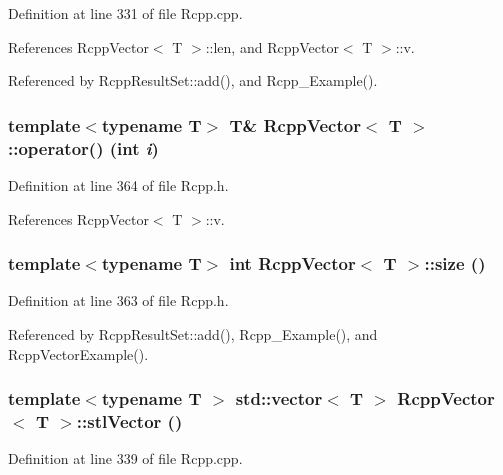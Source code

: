 Definition at line 331 of file Rcpp.cpp.

References RcppVector$<$ T $>$::len, and RcppVector$<$ T $>$::v.

Referenced by RcppResultSet::add(), and Rcpp\_\-Example().\hypertarget{classRcppVector_66aca1da0563af28e55768d98488a42d}{
\subsubsection[{operator()}]{\setlength{\rightskip}{0pt plus 5cm}template$<$typename T$>$ T\& {\bf RcppVector}$<$ T $>$::operator() (int {\em i})}}
\label{classRcppVector_66aca1da0563af28e55768d98488a42d}




Definition at line 364 of file Rcpp.h.

References RcppVector$<$ T $>$::v.\hypertarget{classRcppVector_1e2424dc9b91014ba8b2c9351d97eb37}{
\subsubsection[{size}]{\setlength{\rightskip}{0pt plus 5cm}template$<$typename T$>$ int {\bf RcppVector}$<$ T $>$::size ()}}
\label{classRcppVector_1e2424dc9b91014ba8b2c9351d97eb37}




Definition at line 363 of file Rcpp.h.

Referenced by RcppResultSet::add(), Rcpp\_\-Example(), and RcppVectorExample().\hypertarget{classRcppVector_c650f89b966962b167f3bc42aecf213b}{
\subsubsection[{stlVector}]{\setlength{\rightskip}{0pt plus 5cm}template$<$typename T $>$ std::vector$<$ T $>$ {\bf RcppVector}$<$ T $>$::stlVector ()}}
\label{classRcppVector_c650f89b966962b167f3bc42aecf213b}




Definition at line 339 of file Rcpp.cpp.

